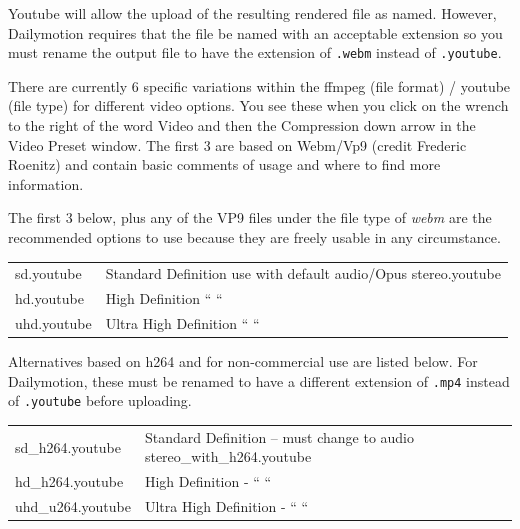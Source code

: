 Youtube will allow the upload of the resulting rendered file as named.  However, Dailymotion requires that the file be named with an acceptable extension so you must rename the output file to have the extension of \texttt{.webm} instead of \texttt{.youtube}.

There are currently 6 specific variations within the ffmpeg (file format) / youtube (file type) for different video options.  You see these when you click on the wrench to the right of the word Video and then the Compression down arrow in the Video Preset window.  The first 3 are based on Webm/Vp9 (credit Frederic Roenitz) and contain basic comments of usage and where to find more information.

The first 3 below, plus any of the VP9 files under the file type of \textit{webm} are the recommended options to use because they are freely usable in any circumstance.

\begin{center}
	\begin{tabular}{l p{8cm}}
		sd.youtube & Standard Definition use with default audio/Opus stereo.youtube \\
		hd.youtube & High Definition “ “ \\
		uhd.youtube & Ultra High Definition “ “ \\
	\end{tabular}
\end{center}

Alternatives based on h264 and for non-commercial use are listed below.  For Dailymotion, these must be renamed to have a different extension of \texttt{.mp4} instead of \texttt{.youtube} before uploading.

\begin{center}
	\begin{tabular}{l p{8cm}}
		sd\_h264.youtube & Standard Definition – must change to audio stereo\_with\_h264.youtube \\
		hd\_h264.youtube & High Definition -          “ “ \\
		uhd\_u264.youtube & Ultra High Definition - “ “ \\
	\end{tabular}
\end{center}